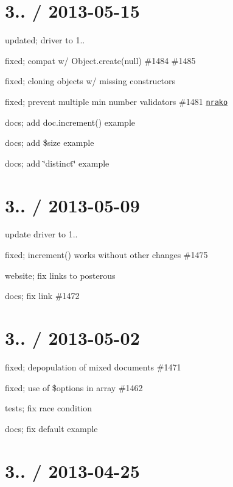 \section*{3.. / 2013-\/05-\/15 }


\begin{DoxyItemize}
\item updated; driver to 1..
\item fixed; compat w/ Object.\+create(null) \#1484 \#1485
\item fixed; cloning objects w/ missing constructors
\item fixed; prevent multiple min number validators \#1481 \href{https://github.com/nrako}{\tt nrako}
\item docs; add doc.\+increment() example
\item docs; add \$size example
\item docs; add \char`\"{}distinct\char`\"{} example
\end{DoxyItemize}

\section*{3.. / 2013-\/05-\/09 }


\begin{DoxyItemize}
\item update driver to 1..
\item fixed; increment() works without other changes \#1475
\item website; fix links to posterous
\item docs; fix link \#1472
\end{DoxyItemize}

\section*{3.. / 2013-\/05-\/02 }


\begin{DoxyItemize}
\item fixed; depopulation of mixed documents \#1471
\item fixed; use of \$options in array \#1462
\item tests; fix race condition
\item docs; fix default example
\end{DoxyItemize}

\section*{3.. / 2013-\/04-\/25 }


